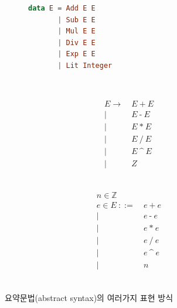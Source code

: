 \documentclass[b5paper,chapter,figtabcapt]{oblivoir}
\begin{document}
\begin{figure}[H]\vspace*{-4ex}
\begin{subfigure}[b]{0.3\textwidth}
\begin{lstlisting}[language=Haskell,basicstyle=\linespread{1.1}\ttfamily]
data E = Add E E
       | Sub E E
       | Mul E E
       | Div E E
       | Exp E E
       | Lit Integer
\end{lstlisting}
~\vspace{-3.3ex}
\end{subfigure}
\hfill
\begin{subfigure}[b]{0.3\textwidth}\addtolength{\jot}{-.2em}
\begin{align*}
E  \to ~& E ~\texttt{+}~ E
\\ \mid~& E ~\texttt{-}~ E
\\ \mid~& E ~\texttt{*}~ E
\\ \mid~& E ~\texttt{/}~ E
\\ \mid~& E ~\texttt{\char`^}~ E
\\ \mid~& Z
\end{align*}
~\vspace{-4ex}
\end{subfigure}
\hfill
\begin{subfigure}[b]{0.3\textwidth}\addtolength{\jot}{-.2em}
\begin{align*}
n\in \mathbb{Z} \qquad\;& \\
e\in E ~
   ::= ~& e ~\texttt{+}~ e
\\ \mid~& e ~\texttt{-}~ e
\\ \mid~& e ~\texttt{*}~ e
\\ \mid~& e ~\texttt{/}~ e
\\ \mid~& e ~\texttt{\char`^}~ e
\\ \mid~& n_{\phantom{g}}
\end{align*}
~\vspace{-4ex}
\end{subfigure}
\caption{요약문법(abstract syntax)의 여러가지 표현 방식
         \label{fig:AbsSyn}}
\end{figure}
\end{document}

